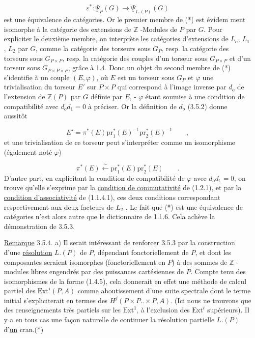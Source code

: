 \begin{equation}\tag{*}
\varepsilon^* : \underline{\Psi}_P(G) \longrightarrow \underline{\Psi}_{L.(P)}(G)
\end{equation}
est une équivalence de catégories. Or le premier membre de (*) est évidem
ment isomorphe à la catégorie des extensions de $\mathbb{Z}$ -Modules de $P$ par $G$. Pour expliciter le deuxième membre, on interprète les catégories d'extensions de $L_o$, $L_1$, $L_2$ par $G$, comme la catégorie des torseurs sous $G_P$, resp. la catégorie des torseurs sous $G_{P \times P}$, resp. la catégorie des couples d'un torseur sous $G_{P \times P}$ et d'un torseur sous $G_{P \times P \times P}$, grâce à 1.4. Donc un objet du second membre de (*) s'identifie à un couple $(E,\varphi)$, où $E$ est un torseur sous $G_P$ et $\varphi$ une trivialisation du torseur $E'$ sur $P \times P$ qui correspond à l'image inverse par $d_o$ de l'extension de $\mathbb{Z}(P)$ par $G$ définie par $E$, - $\varphi$ étant soumise à une condition de compatibilité avec $d_o d_1 = 0$ à préciser. Or la définition de $d_o$ (3.5.2) donne aussitôt

\begin{equation*}
E' = \pi^*(E)\mathrm{pr}_1^*(E)^{-1}\mathrm{pr}_2^*(E)^{-1} \qquad ,
\end{equation*}
et une trivialisation de ce torseur peut s'interpréter comme un isomorphisme (également noté $\varphi$)

\begin{equation*}
\pi^*(E) \xleftarrow{\sim} \mathrm{pr}_1^*(E)\mathrm{pr}_2^*(E) \qquad .
\end{equation*}
D'autre part, en explicitant la condition de compatibilité de $\varphi$ avec $d_o d_1 = 0$, on trouve qu'elle s'exprime par la \underline{condition de commutativité} de (1.2.1), et par la \underline{condition d'associativité} de (1.1.4.1), ces deux conditions correspondant respectivement aux deux facteurs de $L_2$ . Le fait que (*) est une équivalence de catégories n'est alors autre que le dictionnaire de 1.1.6. Cela achève la démonstration de 3.5.3.

\underline{Remarque} 3.5.4. a)  Il serait intéressant de renforcer 3.5.3 par la construction d'une \underline{résolution} $L.(P)$ de $P$, dépendant fonctoriellement de $P$, et dont les composantes seraient isomorphes (fonctoriellement en $P$) à des sommes de $\mathbb{Z}$ -modules libres engendrés par des puissances cartésiennes
de $P$. Compte tenu des isomorphismes de la forme (1.4.5), cela donnerait en effet une méthode de calcul partiel des $\mathrm{Ext}^i(P,A)$ comme aboutissement d'une suite spectrale dont le terme  initial s'expliciterait en termes des $H^j(P \times P .. \times P, A)$. (Ici nous ne trouvons que des renseignements très partiels sur les $\mathrm{Ext}^1$, à l'exclusion des $\mathrm{Ext}^i$ supérieurs). Il y a en tous cas une façon naturelle de continuer la résolution partielle $L.(P)$ d'\underline{un} cran.(*)

